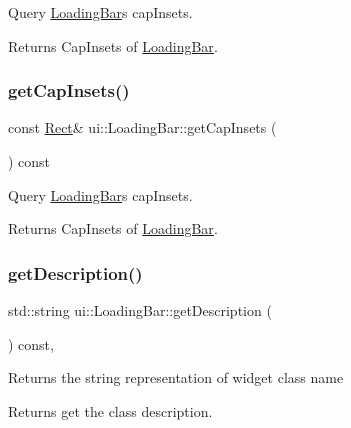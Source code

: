 Query \hyperlink{classui_1_1LoadingBar}{Loading\+Bar}\textquotesingle{}s cap\+Insets. 

\begin{DoxyReturn}{Returns}
Cap\+Insets of \hyperlink{classui_1_1LoadingBar}{Loading\+Bar}. 
\end{DoxyReturn}
\mbox{\label{classui_1_1LoadingBar_aa2d6c3f411702d09c2388066a4ceb7ef}} 
\subsubsection{\texorpdfstring{get\+Cap\+Insets()}{getCapInsets()}\hspace{0.1cm}{\footnotesize\ttfamily [2/2]}}
{\footnotesize\ttfamily const \hyperlink{classRect}{Rect}\& ui\+::\+Loading\+Bar\+::get\+Cap\+Insets (\begin{DoxyParamCaption}{ }\end{DoxyParamCaption}) const}



Query \hyperlink{classui_1_1LoadingBar}{Loading\+Bar}\textquotesingle{}s cap\+Insets. 

\begin{DoxyReturn}{Returns}
Cap\+Insets of \hyperlink{classui_1_1LoadingBar}{Loading\+Bar}. 
\end{DoxyReturn}
\mbox{\label{classui_1_1LoadingBar_afb956804ae7e7b17a5a5810974ca9d99}} 
\subsubsection{\texorpdfstring{get\+Description()}{getDescription()}\hspace{0.1cm}{\footnotesize\ttfamily [1/2]}}
{\footnotesize\ttfamily std\+::string ui\+::\+Loading\+Bar\+::get\+Description (\begin{DoxyParamCaption}{ }\end{DoxyParamCaption}) const\hspace{0.3cm}{\ttfamily [override]}, {\ttfamily [virtual]}}

Returns the string representation of widget class name \begin{DoxyReturn}{Returns}
get the class description. 
\end{DoxyReturn}


